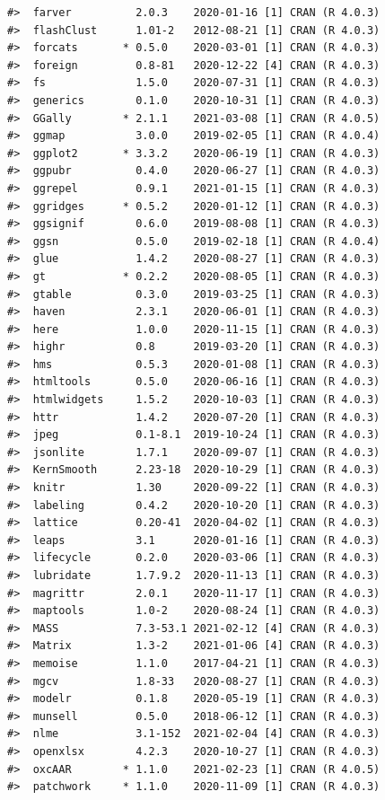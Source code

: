 \documentclass[
]{article}
\begin{document}
\begin{verbatim}
#>  farver          2.0.3    2020-01-16 [1] CRAN (R 4.0.3)
#>  flashClust      1.01-2   2012-08-21 [1] CRAN (R 4.0.3)
#>  forcats       * 0.5.0    2020-03-01 [1] CRAN (R 4.0.3)
#>  foreign         0.8-81   2020-12-22 [4] CRAN (R 4.0.3)
#>  fs              1.5.0    2020-07-31 [1] CRAN (R 4.0.3)
#>  generics        0.1.0    2020-10-31 [1] CRAN (R 4.0.3)
#>  GGally        * 2.1.1    2021-03-08 [1] CRAN (R 4.0.5)
#>  ggmap           3.0.0    2019-02-05 [1] CRAN (R 4.0.4)
#>  ggplot2       * 3.3.2    2020-06-19 [1] CRAN (R 4.0.3)
#>  ggpubr          0.4.0    2020-06-27 [1] CRAN (R 4.0.3)
#>  ggrepel         0.9.1    2021-01-15 [1] CRAN (R 4.0.3)
#>  ggridges      * 0.5.2    2020-01-12 [1] CRAN (R 4.0.3)
#>  ggsignif        0.6.0    2019-08-08 [1] CRAN (R 4.0.3)
#>  ggsn            0.5.0    2019-02-18 [1] CRAN (R 4.0.4)
#>  glue            1.4.2    2020-08-27 [1] CRAN (R 4.0.3)
#>  gt            * 0.2.2    2020-08-05 [1] CRAN (R 4.0.3)
#>  gtable          0.3.0    2019-03-25 [1] CRAN (R 4.0.3)
#>  haven           2.3.1    2020-06-01 [1] CRAN (R 4.0.3)
#>  here            1.0.0    2020-11-15 [1] CRAN (R 4.0.3)
#>  highr           0.8      2019-03-20 [1] CRAN (R 4.0.3)
#>  hms             0.5.3    2020-01-08 [1] CRAN (R 4.0.3)
#>  htmltools       0.5.0    2020-06-16 [1] CRAN (R 4.0.3)
#>  htmlwidgets     1.5.2    2020-10-03 [1] CRAN (R 4.0.3)
#>  httr            1.4.2    2020-07-20 [1] CRAN (R 4.0.3)
#>  jpeg            0.1-8.1  2019-10-24 [1] CRAN (R 4.0.3)
#>  jsonlite        1.7.1    2020-09-07 [1] CRAN (R 4.0.3)
#>  KernSmooth      2.23-18  2020-10-29 [1] CRAN (R 4.0.3)
#>  knitr           1.30     2020-09-22 [1] CRAN (R 4.0.3)
#>  labeling        0.4.2    2020-10-20 [1] CRAN (R 4.0.3)
#>  lattice         0.20-41  2020-04-02 [1] CRAN (R 4.0.3)
#>  leaps           3.1      2020-01-16 [1] CRAN (R 4.0.3)
#>  lifecycle       0.2.0    2020-03-06 [1] CRAN (R 4.0.3)
#>  lubridate       1.7.9.2  2020-11-13 [1] CRAN (R 4.0.3)
#>  magrittr        2.0.1    2020-11-17 [1] CRAN (R 4.0.3)
#>  maptools        1.0-2    2020-08-24 [1] CRAN (R 4.0.3)
#>  MASS            7.3-53.1 2021-02-12 [4] CRAN (R 4.0.3)
#>  Matrix          1.3-2    2021-01-06 [4] CRAN (R 4.0.3)
#>  memoise         1.1.0    2017-04-21 [1] CRAN (R 4.0.3)
#>  mgcv            1.8-33   2020-08-27 [1] CRAN (R 4.0.3)
#>  modelr          0.1.8    2020-05-19 [1] CRAN (R 4.0.3)
#>  munsell         0.5.0    2018-06-12 [1] CRAN (R 4.0.3)
#>  nlme            3.1-152  2021-02-04 [4] CRAN (R 4.0.3)
#>  openxlsx        4.2.3    2020-10-27 [1] CRAN (R 4.0.3)
#>  oxcAAR        * 1.1.0    2021-02-23 [1] CRAN (R 4.0.5)
#>  patchwork     * 1.1.0    2020-11-09 [1] CRAN (R 4.0.3)

\end{verbatim}
\end{document}

